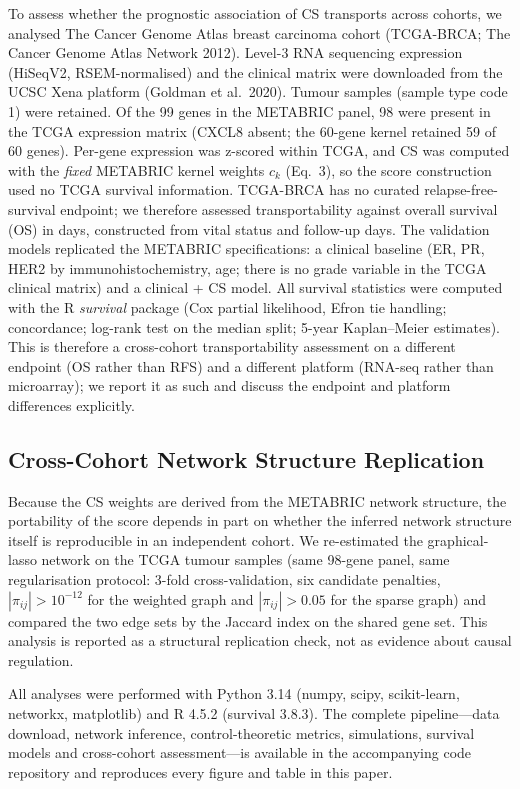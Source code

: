 \documentclass[12pt]{article}
\begin{document}
To assess whether the prognostic association of CS transports across
cohorts, we analysed The Cancer Genome Atlas breast carcinoma
cohort (TCGA-BRCA; The Cancer Genome Atlas Network 2012). Level-3 RNA
sequencing expression (HiSeqV2, RSEM-normalised) and the clinical matrix
were downloaded from the UCSC Xena platform (Goldman et al.\ 2020). Tumour
samples (sample type code 1) were retained. Of the 99 genes in the
METABRIC panel, 98 were present in the TCGA expression matrix (CXCL8 absent;
the 60-gene kernel retained 59 of 60 genes). Per-gene expression was
z-scored within TCGA, and CS was computed with the \emph{fixed} METABRIC
kernel weights $c_k$ (Eq.~3), so the score construction used no TCGA
survival information. TCGA-BRCA has no curated relapse-free-survival
endpoint; we therefore assessed transportability against overall survival (OS) in days,
constructed from vital status and follow-up days. The validation models
replicated the METABRIC specifications: a clinical baseline (ER, PR, HER2
by immunohistochemistry, age; there is no grade variable in the TCGA
clinical matrix) and a clinical + CS model. All survival statistics were
computed with the R \emph{survival} package (Cox partial likelihood, Efron
tie handling; concordance; log-rank test on the median split; 5-year
Kaplan--Meier estimates). This is therefore a cross-cohort
transportability assessment on a different endpoint (OS rather than RFS) and a different
platform (RNA-seq rather than microarray); we report it as such and discuss
the endpoint and platform differences explicitly.

\subsection{Cross-Cohort Network Structure Replication}

Because the CS weights are derived from the METABRIC network structure, the
portability of the score depends in part on whether the inferred network
structure itself is reproducible in an independent cohort. We re-estimated
the graphical-lasso network on the TCGA tumour samples (same 98-gene panel,
same regularisation protocol: 3-fold cross-validation, six candidate
penalties, $|\pi_{ij}| > 10^{-12}$ for the weighted graph and $|\pi_{ij}|
> 0.05$ for the sparse graph) and compared the two edge sets by the Jaccard
index on the shared gene set. This analysis is reported as a structural
replication check, not as evidence about causal regulation.

All analyses were performed with Python 3.14 (numpy, scipy, scikit-learn,
networkx, matplotlib) and R 4.5.2 (survival 3.8.3). The complete
pipeline---data download, network inference, control-theoretic metrics,
simulations, survival models and cross-cohort assessment---is available in the
accompanying code repository and reproduces every figure and table in this
paper.
\end{document}
